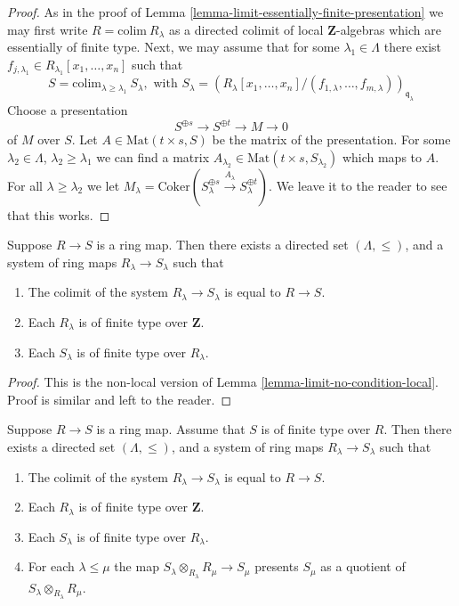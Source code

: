 \begin{proof}
As in the proof of Lemma \ref{lemma-limit-essentially-finite-presentation}
we may first write $R = \text{colim}\ R_\lambda$ as a directed colimit
of local $\mathbf{Z}$-algebras which are essentially of finite type.
Next, we may assume that for some $\lambda_1 \in \Lambda$ there
exist $f_{j, \lambda_1} \in R_{\lambda_1}[x_1,\ldots,x_n]$
such that
$$
S =
\text{colim}_{\lambda \geq \lambda_1}\ S_\lambda, \text{ with }
S_\lambda = 
(R_\lambda[x_1,\ldots,x_n]/(f_{1,\lambda},\ldots,f_{m,\lambda}))_{\mathfrak 
q_\lambda}
$$
Choose a presentation
$$
S^{\oplus s} \to S^{\oplus t} \to M \to 0
$$
of $M$ over $S$. Let $A \in \text{Mat}(t\times s, S)$ be
the matrix of the presentation. For some $\lambda_2 \in \Lambda$,
$\lambda_2 \geq \lambda_1$
we can find a matrix $A_{\lambda_2} \in \text{Mat}(t\times s, S_{\lambda_2})$
which maps to $A$. For all $\lambda \geq \lambda_2$ we let
$M_\lambda = \text{Coker}(S_\lambda^{\oplus s} \xrightarrow{A_\lambda}
S_\lambda^{\oplus t})$. We leave it to the reader to see that
this works.
\end{proof}

\begin{lemma}
\label{lemma-limit-no-condition}
Suppose $R \to S$ is a ring map.
Then there exists a directed set $(\Lambda, \leq)$, and
a system of ring maps $R_\lambda \to S_\lambda$
such that
\begin{enumerate}
\item The colimit of the system $R_\lambda \to S_\lambda$
is equal to $R \to S$.
\item Each $R_\lambda$ is of finite type
over $\mathbf{Z}$.
\item Each $S_\lambda$ is of finite type
over $R_\lambda$.
\end{enumerate}
\end{lemma}

\begin{proof}
This is the non-local version of
Lemma \ref{lemma-limit-no-condition-local}.
Proof is similar and left to the reader.
\end{proof}

\begin{lemma}
\label{lemma-limit-finite-type}
Suppose $R \to S$ is a ring map.
Assume that $S$ is of finite type over $R$.
Then there exists a directed set $(\Lambda, \leq)$, and
a system of ring maps $R_\lambda \to S_\lambda$
such that
\begin{enumerate}
\item The colimit of the system $R_\lambda \to S_\lambda$
is equal to $R \to S$.
\item Each $R_\lambda$ is of finite type
over $\mathbf{Z}$.
\item Each $S_\lambda$ is of finite type
over $R_\lambda$.
\item For each $\lambda \leq \mu$ the map
$S_\lambda \otimes_{R_\lambda} R_\mu \to S_\mu$
presents $S_\mu$ as a quotient
of $S_\lambda \otimes_{R_\lambda} R_\mu$.
\end{enumerate}
\end{lemma}

